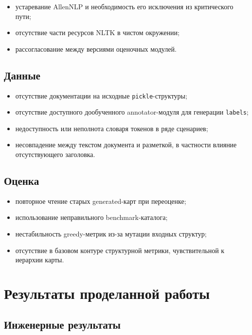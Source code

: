 \documentclass[12pt,a4paper]{article}
\begin{document}
\begin{itemize}
    \item устаревание AllenNLP и необходимость его исключения из критического пути;
    \item отсутствие части ресурсов NLTK в чистом окружении;
    \item рассогласование между версиями оценочных модулей.
\end{itemize}

\subsection{Данные}

\begin{itemize}
    \item отсутствие документации на исходные \texttt{pickle}-структуры;
    \item отсутствие доступного дообученного annotator-модуля для генерации \texttt{labels};
    \item недоступность или неполнота словаря токенов в ряде сценариев;
    \item несовпадение между текстом документа и разметкой, в частности влияние отсутствующего заголовка.
\end{itemize}

\subsection{Оценка}

\begin{itemize}
    \item повторное чтение старых generated-карт при переоценке;
    \item использование неправильного benchmark-каталога;
    \item нестабильность greedy-метрик из-за мутации входных структур;
    \item отсутствие в базовом контуре структурной метрики, чувствительной к иерархии карты.
\end{itemize}

\section{Результаты проделанной работы}

\subsection{Инженерные результаты}
\end{document}
